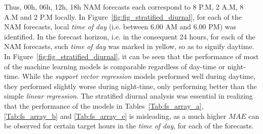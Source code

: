\par Thus, 00h, 06h, 12h, 18h NAM forecasts each correspond to 8 P.M, 2 A.M, 8 A.M and 2 P.M locally. In Figure~\ref{fig:fig_stratified_diurnal}, for each of the NAM forecasts, local \textit{time of day} (i.e. between 6.00 AM and 6.00 PM) was identified. In the forecast horizon, i.e. in the consequent 24 hours, for each of the NAM forecasts, such \textit{time of day} was marked in yellow, so as to signify daytime. In Figure~\ref{fig:fig_stratified_diurnal}, it can be seen that the performance of most of the machine learning models is comparable regardless of day-time or night-time. While the \textit{support vector regression} models performed well during daytime, they performed slightly worse during night-time, only performing better than the simple \textit{linear regression}. The stratified diurnal analysis was essential in realizing that the performance of the models in Tables~\ref{Tab:fs_array_a}, \ref{Tab:fs_array_b} and \ref{Tab:fs_array_e} is misleading, as a much higher $MAE$ can be observed for certain target hours in the \textit{time of day}, for each of the forecasts.

